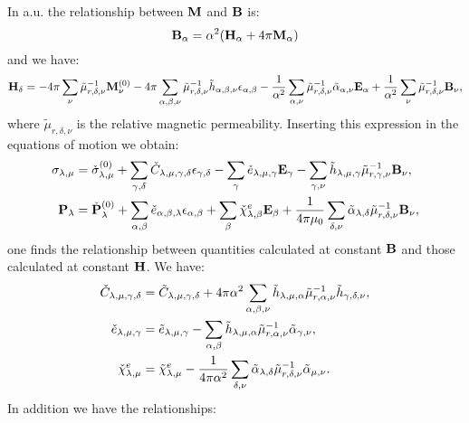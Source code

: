 \documentclass[12pt,a4paper]{article}
\begin{document}
{\color{web-blue}
In a.u. the relationship between ${\bf M}$ and ${\bf B}$ is:
\begin{equation}
{\bf B}_\alpha= \alpha^2 ({\bf H}_\alpha+4 \pi {\bf M}_\alpha)
\end{equation}
and we have:
\begin{equation}
{\bf H}_\delta = - 4 \pi \sum_\nu \tilde \mu^{-1}_{r,\delta,\nu} 
{\bf M}^{(0)}_\nu
- 4 \pi \sum_{\alpha,\beta,\nu} \tilde \mu^{-1}_{r,\delta,\nu} 
\tilde h_{\alpha,\beta,\nu}
\epsilon_{\alpha,\beta} - {1\over \alpha^2} \sum_{\alpha,\nu}
\tilde \mu^{-1}_{r,\delta,\nu} \tilde \alpha_{\alpha,\nu} {\bf E}_\alpha
+ {1\over \alpha^2} \sum_\nu \tilde \mu^{-1}_{r,\delta,\nu} {\bf B}_\nu, 
\end{equation}
where $\tilde \mu_{r,\delta,\nu}$ is the relative magnetic
permeability.
Inserting this expression in the equations of motion we obtain:
\begin{align}
\sigma_{\lambda,\mu}&= \check \sigma_{\lambda,\mu}^{(0)}
+\sum_{\gamma,\delta} \check C_{\lambda,\mu,\gamma,\delta}  
\epsilon_{\gamma,\delta} -
\sum_{\gamma} \check e_{\lambda,\mu,\gamma} 
 {\bf E}_{\gamma}
-\sum_{\gamma,\nu}  \tilde h_{\lambda,\mu,\gamma} 
\tilde \mu^{-1}_{r,\gamma,\nu} {\bf B}_{\nu}, \\
{\bf P}_{\lambda}&= \check {\bf P}^{(0)}_{\lambda}
+\sum_{\alpha,\beta} \check e_{\alpha,\beta,\lambda} 
\epsilon_{\alpha,\beta} +
\sum_{\beta} 
\check \chi^e_{\lambda,\beta}
{\bf E}_{\beta} +
{1\over 4 \pi \mu_0}\sum_{\delta,\nu} \tilde \alpha_{\lambda,\delta} 
\tilde \mu^{-1}_{r,\delta,\nu}  
{\bf B}_{\nu}, 
\end{align}
one finds the relationship between quantities calculated at constant 
${\bf B}$ and those calculated at constant ${\bf H}$. We have:
\begin{align}
\check C_{\lambda,\mu,\gamma,\delta} &=
\tilde C_{\lambda,\mu,\gamma,\delta} + 4 \pi \alpha^2 \sum_{\alpha,\beta,\nu}
\tilde h_{\lambda,\mu,\alpha} \tilde \mu^{-1}_{r,\alpha,\nu} 
\tilde h_{\gamma,\delta,\nu}, \\
\check e_{\lambda,\mu,\gamma}&= \tilde e_{\lambda,\mu,\gamma}
- \sum_{\alpha,\beta} \tilde h_{\lambda,\mu,\alpha} 
\tilde \mu^{-1}_{r,\alpha,\nu}
\tilde \alpha_{\gamma,\nu}, \\
\check \chi^e_{\lambda,\mu}&= \tilde \chi^e_{\lambda,\mu}
-{1\over 4 \pi \alpha^2} \sum_{\delta,\nu} \tilde \alpha_{\lambda,\delta} 
\tilde \mu^{-1}_{r,\delta,\nu} \tilde \alpha_{\mu,\nu}. 
\end{align}
In addition we have the relationships:
}
\end{document}
